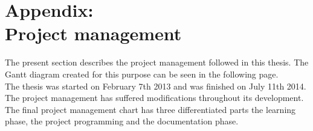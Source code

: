 	\chapter{Appendix: \\Project management}
	\label{project_management}
		 The present section describes the project management followed in this thesis. The Gantt diagram created for this purpose can be seen in the following page.
		 \\

		 The thesis was started on February 7th 2013 and was finished on July 11th 2014.    
		 The project management has suffered modifications throughout its development.  The final project management chart has three differentiated parts the learning phase, the project programming and the documentation phase. 
\\

